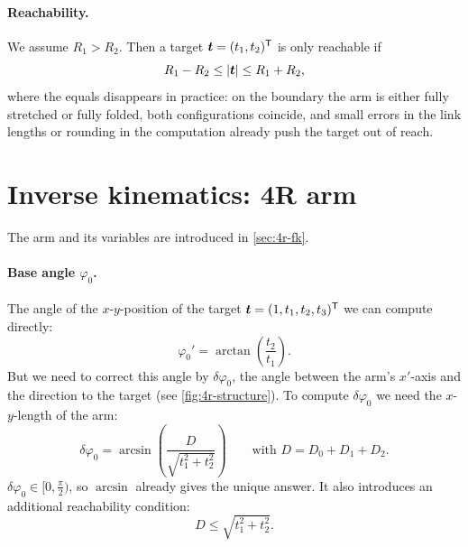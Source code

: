 \paragraph{Reachability.}
We assume $R_1 > R_2$. Then a target $\bm{t} = (t_1, t_2)^{\mathsf{T}}$ is only
reachable if
\[
  R_1 - R_2 \le \lvert \bm{t} \rvert \le R_1 + R_2 ,
\]
where the equals disappears in practice: on the boundary the arm is
either fully stretched or fully folded, both configurations coincide,
and small errors in the link lengths or rounding in the computation
already push the target out of reach.


\section{Inverse kinematics: 4R arm}
\label{sec:4r-ik}

The arm and its variables are introduced in \cref{sec:4r-fk}.

\paragraph{Base angle $\varphi_0$.}
The angle of the $x$-$y$-position of the target
$\bm{t} = (1, t_1, t_2, t_3)^{\mathsf{T}}$ we can compute directly:
\[
  \varphi_0' = \arctan\left(\frac{t_2}{t_1}\right) .
\]
But we need to correct this angle by $\delta\varphi_0$, the angle between
the arm's $x'$-axis and the direction to the target (see
\cref{fig:4r-structure}). To compute $\delta\varphi_0$ we need the
$x$-$y$-length of the arm:
\[
  \delta\varphi_0 = \arcsin\left(\frac{D}{\sqrt{t_1^2 + t_2^2}}\right)
  \qquad\text{with } D = D_0 + D_1 + D_2 .
\]
$\delta\varphi_0 \in [0, \frac{\pi}{2})$, so $\arcsin$ already gives the
unique answer. It also introduces an additional reachability condition:
\[
  D \le \sqrt{t_1^2 + t_2^2} .
\]

